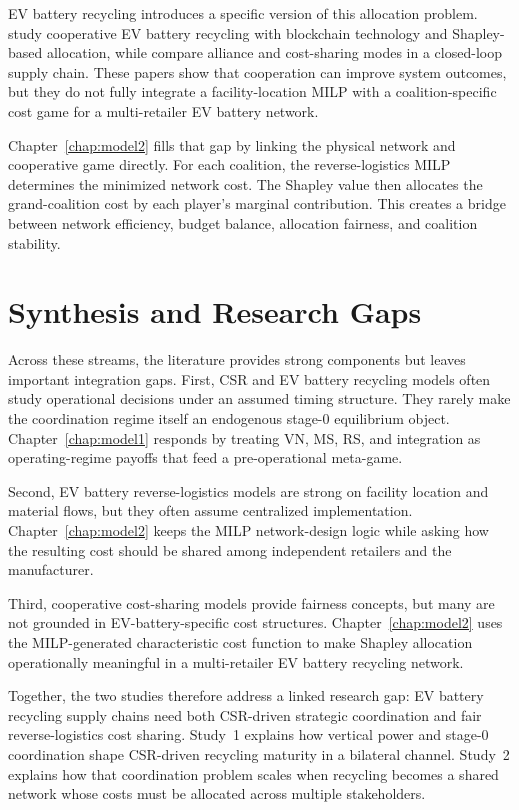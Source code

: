 EV battery recycling introduces a specific version of this allocation problem. \cite{Xiao2024} study cooperative EV battery recycling with blockchain technology and Shapley-based allocation, while \cite{ZhengB2022} compare alliance and cost-sharing modes in a closed-loop supply chain. These papers show that cooperation can improve system outcomes, but they do not fully integrate a facility-location MILP with a coalition-specific cost game for a multi-retailer EV battery network.

Chapter~\ref{chap:model2} fills that gap by linking the physical network and cooperative game directly. For each coalition, the reverse-logistics MILP determines the minimized network cost. The Shapley value then allocates the grand-coalition cost by each player's marginal contribution. This creates a bridge between network efficiency, budget balance, allocation fairness, and coalition stability.

\section{Synthesis and Research Gaps}
\label{sec:lit_gap}

Across these streams, the literature provides strong components but leaves important integration gaps. First, CSR and EV battery recycling models often study operational decisions under an assumed timing structure. They rarely make the coordination regime itself an endogenous stage-0 equilibrium object. Chapter~\ref{chap:model1} responds by treating VN, MS, RS, and integration as operating-regime payoffs that feed a pre-operational meta-game.

Second, EV battery reverse-logistics models are strong on facility location and material flows, but they often assume centralized implementation. Chapter~\ref{chap:model2} keeps the MILP network-design logic while asking how the resulting cost should be shared among independent retailers and the manufacturer.

Third, cooperative cost-sharing models provide fairness concepts, but many are not grounded in EV-battery-specific cost structures. Chapter~\ref{chap:model2} uses the MILP-generated characteristic cost function to make Shapley allocation operationally meaningful in a multi-retailer EV battery recycling network.

Together, the two studies therefore address a linked research gap: EV battery recycling supply chains need both CSR-driven strategic coordination and fair reverse-logistics cost sharing. Study~1 explains how vertical power and stage-0 coordination shape CSR-driven recycling maturity in a bilateral channel. Study~2 explains how that coordination problem scales when recycling becomes a shared network whose costs must be allocated across multiple stakeholders.
